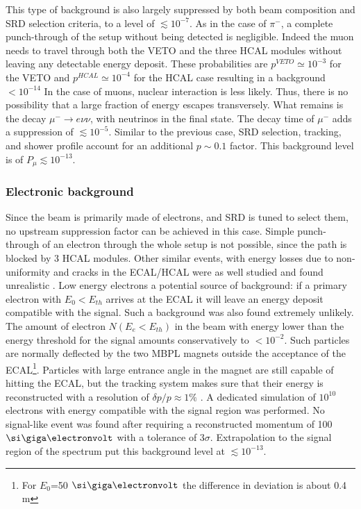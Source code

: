 This type of background is also largely suppressed by both beam composition and SRD selection criteria, to a level of $\lesssim 10^{-7}$. As in the case of $\pi^-$, a complete punch-through of the setup without being detected is negligible. Indeed the muon needs to travel through both the VETO and the three HCAL modules without leaving any detectable energy deposit. These probabilities are $p^{VETO} \simeq 10^{-3}$ for the VETO and $p^{HCAL} \simeq 10^{-4}$ for the HCAL case resulting in a background $< 10^{-14}$
In the case of muons, nuclear interaction is less likely. Thus, there is no possibility that a large fraction of energy escapes transversely. 
What remains is the decay $\mu^- \rightarrow e\nu\nu$, with neutrinos in the final state. The decay time of $\mu^-$ adds a suppression of $\lesssim 10^{-5}$. Similar to the previous case, SRD selection, tracking, and shower profile account for an additional $p\sim 0.1$ factor. This background level is of $P_{\mu} \lesssim 10^{-13}$.

\subsubsection{Electronic background}
\label{ch3:sec:bkg:inv:elec}

Since the beam is primarily made of electrons, and SRD is tuned to select them, no upstream suppression factor can be achieved in this case. Simple punch-through of an electron through the whole setup is not possible, since the path is blocked by 3 HCAL modules. Other similar events, with energy losses due to non-uniformity and cracks in the ECAL/HCAL were as well studied and found unrealistic \cite{Andreas:2013lya}. Low energy electrons a potential source of background: if a primary electron with $E_0 < E_{th}$ arrives at the ECAL it will leave an energy deposit compatible with the signal. Such a background was also found extremely unlikely. The amount of electron $N(E_e<E_{th})$ in the beam with energy lower than the energy threshold for the signal amounts conservatively to $<10^{-2}$. Such particles are normally deflected by the two MBPL magnets outside the acceptance of the ECAL\footnote{For $E_0$=50 $\gev$ the difference in deviation is about 0.4 \si{\meter}}. Particles with large entrance angle in the magnet are still capable of hitting the ECAL, but the tracking system makes sure that their energy is reconstructed with a resolution of $\delta p/p \approx 1\%$ \cite{Banerjee:2017mdu}. A dedicated simulation of $10^{10}$ electrons with energy compatible with the signal region was performed. No signal-like event was found after requiring a reconstructed momentum of 100 $\gev$ with a tolerance of 3$\sigma$. Extrapolation to the signal region of the spectrum put this background level at $\lesssim 10^{-13}$.

